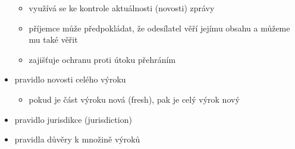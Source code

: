 \begin{itemize}
    \begin{itemize}
        \item využívá se ke kontrole aktuálnosti (novosti) zprávy 
        \item příjemce může předpokládat, že odesílatel věří jejímu obsahu a můžeme mu také věřit
        \item zajišťuje ochranu proti útoku přehráním
    \end{itemize}
    \item pravidlo novosti celého výroku
    \begin{itemize}
        \item pokud je část výroku nová (fresh), pak je celý výrok nový
    \end{itemize}
    \item pravidlo jurisdikce (jurisdiction)
    \item pravidla důvěry k množině výroků
\end{itemize}
